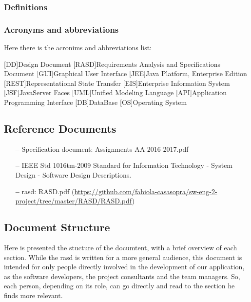 \subsubsection{Definitions} \label{def}
\subsubsection{Acronyms and abbreviations } \label{acr}
Here there is the acronims and abbreviations list:

\begin{acronym}[DD] %

[DD]{Design Document}
[RASD]{Requirements Analysis and Specifications Document}
[GUI]{Graphical User Interface}
[JEE]{Java Platform, Enterprise Edition}
[REST]{Representational State Transfer }
[EIS]{Enterprise Information System}
[JSF]{JavaServer Faces}
[UML]{Unified Modeling Language}
[API]{Application Programming Interface}
[DB]{DataBase}
[OS]{Operating System}

\end{acronym}

\subsection{Reference Documents} \label{ref-doc}

\begin{itemize}
\item[\textbf{--}] Specification document: Assignments AA 2016-2017.pdf
\item[\textbf{--}] IEEE Std 1016tm-2009 Standard for Information Technology - System Design - Software Design Descriptions.
\item[\textbf{--}] \acl{rasd}: RASD.pdf 
\newline
(\url{https://github.com/fabiola-casasopra/sw-eng-2-project/tree/master/RASD/RASD.pdf})
\end{itemize}

\subsection{Document Structure} \label{doc-struct}

Here is presented the stucture of the documtent,  with a brief overview of each section.
While the \acs{rasd} is written for a more general audience, this document is intended for only people directly involved in the development of our application, as the software developers, the project consultants and the team managers. 
So, each person, depending on its role, can go directly and read to the section he finds more relevant. 

